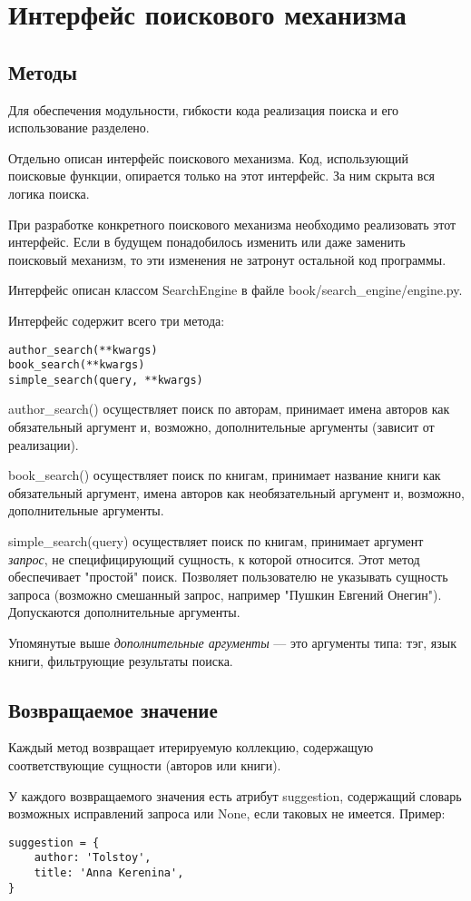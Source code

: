 \section{Интерфейс поискового механизма}

\subsection{Методы}
Для обеспечения модульности, гибкости кода реализация поиска и его использование разделено.

Отдельно описан интерфейс поискового механизма. Код, использующий поисковые функции, опирается только на этот интерфейс. За ним скрыта вся логика поиска.

При разработке конкретного поискового механизма необходимо реализовать этот интерфейс. Если в будущем понадобилось изменить или даже заменить поисковый механизм, то эти изменения не затронут остальной код программы.

Интерфейс описан классом SearchEngine в файле book/search\_engine/engine.py. 

Интерфейс содержит всего три метода:
\begin{verbatim}
author_search(**kwargs)
book_search(**kwargs)
simple_search(query, **kwargs)
\end{verbatim}


author\_search() осуществляет поиск по авторам, принимает имена авторов как обязательный аргумент и, возможно, дополнительные аргументы (зависит от реализации).

book\_search() осуществляет поиск по книгам, принимает название книги как обязательный аргумент, имена авторов как необязательный аргумент и, возможно, дополнительные аргументы. 

simple\_search(query) осуществляет поиск по книгам, принимает аргумент {\em запрос}, не специфицирующий сущность, к которой относится.
Этот метод обеспечивает "простой" поиск.
Позволяет пользователю не указывать сущность запроса (возможно смешанный запрос, например "Пушкин Евгений Онегин"). Допускаются дополнительные аргументы. 

Упомянутые выше {\em дополнительные аргументы} --- это аргументы типа: тэг, язык книги, фильтрующие результаты поиска. 


\subsection{Возвращаемое значение}

Каждый метод возвращает итерируемую коллекцию, содержащую соответствующие сущности (авторов или книги). 

У каждого возвращаемого значения есть атрибут suggestion, содержащий словарь возможных исправлений запроса или None, если таковых не имеется. Пример: 
\begin{verbatim}
suggestion = {
    author: 'Tolstoy',
    title: 'Anna Kerenina',
}
\end{verbatim}
